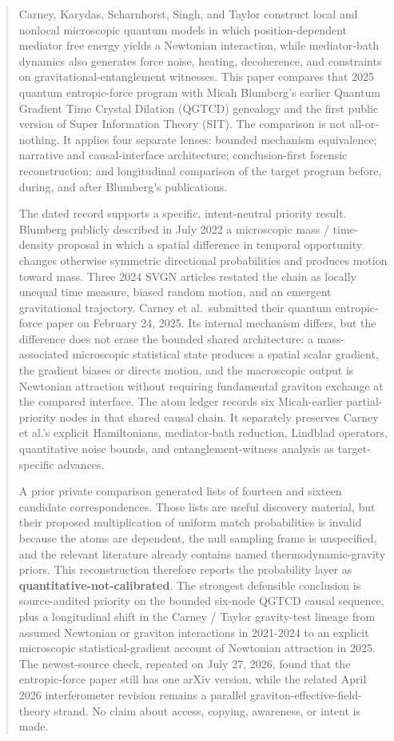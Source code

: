 \documentclass[
  american,
  11pt,
  letterpaper,
]{article}
\begin{document}
\begin{abstract}

Carney, Karydas, Scharnhorst, Singh, and Taylor construct local and nonlocal microscopic quantum models in which position-dependent mediator free energy yields a Newtonian interaction, while mediator-bath dynamics also generates force noise, heating, decoherence, and constraints on gravitational-entanglement witnesses. This paper compares that 2025 quantum entropic-force program with Micah Blumberg's earlier Quantum Gradient Time Crystal Dilation (QGTCD) genealogy and the first public version of Super Information Theory (SIT). The comparison is not all-or-nothing. It applies four separate lenses: bounded mechanism equivalence; narrative and causal-interface architecture; conclusion-first forensic reconstruction; and longitudinal comparison of the target program before, during, and after Blumberg's publications.

The dated record supports a specific, intent-neutral priority result. Blumberg publicly described in July 2022 a microscopic mass / time-density proposal in which a spatial difference in temporal opportunity changes otherwise symmetric directional probabilities and produces motion toward mass. Three 2024 SVGN articles restated the chain as locally unequal time measure, biased random motion, and an emergent gravitational trajectory. Carney et al.~submitted their quantum entropic-force paper on February 24, 2025. Its internal mechanism differs, but the difference does not erase the bounded shared architecture: a mass-associated microscopic statistical state produces a spatial scalar gradient, the gradient biases or directs motion, and the macroscopic output is Newtonian attraction without requiring fundamental graviton exchange at the compared interface. The atom ledger records six Micah-earlier partial-priority nodes in that shared causal chain. It separately preserves Carney et al.'s explicit Hamiltonians, mediator-bath reduction, Lindblad operators, quantitative noise bounds, and entanglement-witness analysis as target-specific advances.

A prior private comparison generated lists of fourteen and sixteen candidate correspondences. Those lists are useful discovery material, but their proposed multiplication of uniform match probabilities is invalid because the atoms are dependent, the null sampling frame is unspecified, and the relevant literature already contains named thermodynamic-gravity priors. This reconstruction therefore reports the probability layer as \textbf{quantitative-not-calibrated}. The strongest defensible conclusion is source-audited priority on the bounded six-node QGTCD causal sequence, plus a longitudinal shift in the Carney / Taylor gravity-test lineage from assumed Newtonian or graviton interactions in 2021-2024 to an explicit microscopic statistical-gradient account of Newtonian attraction in 2025. The newest-source check, repeated on July 27, 2026, found that the entropic-force paper still has one arXiv version, while the related April 2026 interferometer revision remains a parallel graviton-effective-field-theory strand. No claim about access, copying, awareness, or intent is made.

\end{abstract}
\end{document}
